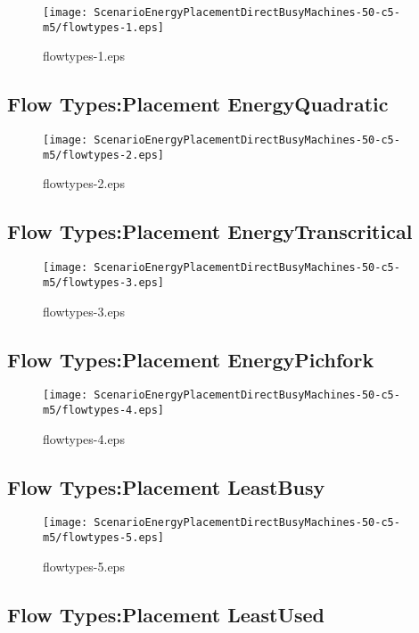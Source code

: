 \documentclass{elsart}
\begin{document}
\begin{figure}[ht]
\centering
\texttt{[image: ScenarioEnergyPlacementDirectBusyMachines-50-c5-m5/flowtypes-1.eps]}
\caption{flowtypes-1.eps}\label{fig:flowtypes-1}
\end{figure}

\clearpage
\subsection{Flow Types:Placement EnergyQuadratic}

\begin{figure}[ht]
\centering
\texttt{[image: ScenarioEnergyPlacementDirectBusyMachines-50-c5-m5/flowtypes-2.eps]}
\caption{flowtypes-2.eps}\label{fig:flowtypes-2}
\end{figure}

\clearpage
\subsection{Flow Types:Placement EnergyTranscritical}

\begin{figure}[ht]
\centering
\texttt{[image: ScenarioEnergyPlacementDirectBusyMachines-50-c5-m5/flowtypes-3.eps]}
\caption{flowtypes-3.eps}\label{fig:flowtypes-3}
\end{figure}

\clearpage
\subsection{Flow Types:Placement EnergyPichfork}

\begin{figure}[ht]
\centering
\texttt{[image: ScenarioEnergyPlacementDirectBusyMachines-50-c5-m5/flowtypes-4.eps]}
\caption{flowtypes-4.eps}\label{fig:flowtypes-4}
\end{figure}

\clearpage
\subsection{Flow Types:Placement LeastBusy}

\begin{figure}[ht]
\centering
\texttt{[image: ScenarioEnergyPlacementDirectBusyMachines-50-c5-m5/flowtypes-5.eps]}
\caption{flowtypes-5.eps}\label{fig:flowtypes-5}
\end{figure}

\clearpage
\subsection{Flow Types:Placement LeastUsed}
\end{document}
